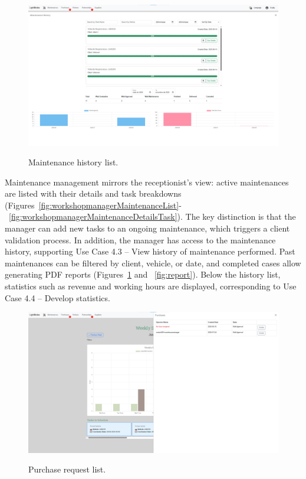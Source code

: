 \begin{figure}[h]
  \caption{Maintenance history list.}
  \centering
  \includegraphics[width=\textwidth]{figs/Implementation/workshopmanager/maintenanceHistory}
  \label{fig:maintenanceHistory}
\end{figure}



Maintenance management mirrors the receptionist's view: active maintenances are listed with their details and task breakdowns (Figures~\ref{fig:workshopmanagerMaintenanceList}-~\ref{fig:workshopmanagerMaintenanceDetailsTask}). The key distinction is that the manager can add new tasks to an ongoing maintenance, which triggers a client validation process. In addition, the manager has access to the maintenance history, supporting Use Case 4.3 – View history of maintenance performed. Past maintenances can be filtered by client, vehicle, or date, and completed cases allow generating PDF reports (Figures~\ref{fig:maintenanceHistory} and ~\ref{fig:report}). Below the history list, statistics such as revenue and working hours are displayed, corresponding to Use Case 4.4 – Develop statistics.

\begin{figure}[h]
  \caption{Purchase request list.}
  \centering
  \includegraphics[width=\textwidth]{figs/Implementation/workshopmanager/purchaseList}
  \label{fig:workshopmanagerPurchaseList}
\end{figure}



